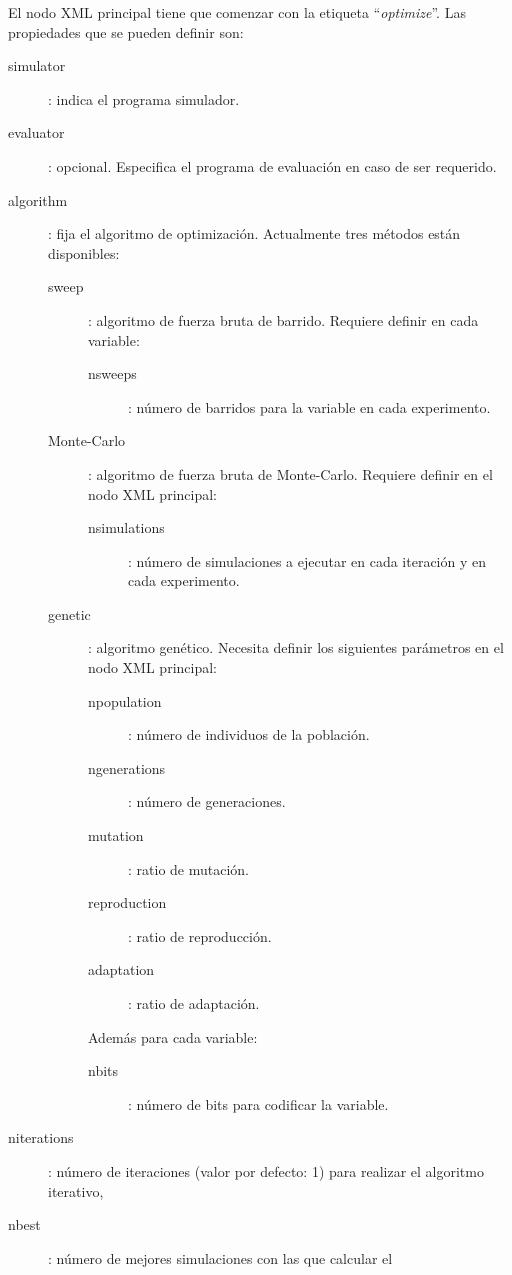 \documentclass[a4paper]{report}
\begin{document}
El nodo XML principal tiene que comenzar con la etiqueta ``\emph{optimize}''.
Las propiedades que se pueden definir son:
\begin{description}
	\item[simulator]: indica el programa simulador.
	\item[evaluator]: opcional. Especifica el programa de evaluación en caso de
		ser requerido.
	\item[algorithm]: fija el algoritmo de optimización. Actualmente tres
		métodos están disponibles:
	\begin{description}
		\item[sweep]: algoritmo de fuerza bruta de barrido. Requiere definir en
			cada variable:
		\begin{description}
			\item[nsweeps]: número de barridos para la variable en cada
				experimento.
		\end{description}
	\item[Monte-Carlo]: algoritmo de fuerza bruta de Monte-Carlo. Requiere
		definir en el nodo XML principal:
		\begin{description}
			\item[nsimulations]: número de simulaciones a ejecutar en cada
				iteración y en cada experimento.
		\end{description}
	\item[genetic]: algoritmo genético. Necesita definir los siguientes
		parámetros en el nodo XML principal:
		\begin{description}
			\item[npopulation]: número de individuos de la población.
			\item[ngenerations]: número de generaciones.
			\item[mutation]: ratio de mutación.
			\item[reproduction]: ratio de reproducción.
			\item[adaptation]: ratio de adaptación.
		\end{description}
	Además para cada variable:
		\begin{description}
			\item[nbits]: número de bits para codificar la variable.
		\end{description}
	\end{description}
	\item[niterations]: número de iteraciones (valor por defecto: 1) para
		realizar el algoritmo iterativo,
	\item[nbest]: número de mejores simulaciones con las que calcular el

\end{description}
\end{document}

